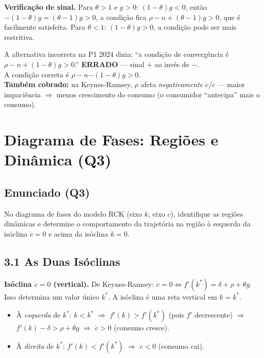 \documentclass[12pt, a4paper]{article}
\begin{document}
\textbf{Verificação de sinal.} Para $\theta > 1$ e $g > 0$: $(1-\theta)g < 0$, então $-(1-\theta)g = (\theta-1)g > 0$, a condição fica $\rho - n + (\theta-1)g > 0$, que é facilmente satisfeita. Para $\theta < 1$: $(1-\theta)g > 0$, a condição pode ser mais restritiva.

\begin{provabox}[title={P1 2024 Q2 --- O Sinal que Todo Mundo Erra}]
A alternativa incorreta na P1 2024 dizia: ``a condição de convergência é $\rho - n + (1-\theta)g > 0$.'' \textbf{ERRADO} --- sinal $+$ ao invés de $-$.\\
A condição correta é $\rho - n \mathbf{-} (1-\theta)g > 0$.\\
\textbf{Também cobrado:} na Keynes-Ramsey, $\rho$ afeta \emph{negativamente} $\dot{c}/c$ --- maior impaciência $\Rightarrow$ menos crescimento do consumo (o consumidor ``antecipa'' mais o consumo).
\end{provabox}

\section{Diagrama de Fases: Regiões e Dinâmica (Q3)}

\subsection*{Enunciado (Q3)}

No diagrama de fases do modelo RCK (eixo $k$, eixo $c$), identifique as regiões dinâmicas e determine o comportamento da trajetória na região à esquerda da isóclina $\dot{c}=0$ e acima da isóclina $\dot{k}=0$.

\subsection*{3.1 As Duas Isóclinas}

\textbf{Isóclina $\dot{c}=0$ (vertical).} De Keynes-Ramsey: $\dot{c}=0 \Leftrightarrow f'(k^*)=\delta+\rho+\theta g$. Isso determina um valor único $k^*$. A isóclina é uma reta vertical em $k = k^*$.

\begin{itemize}
\item À \emph{esquerda} de $k^*$: $k < k^*$ $\Rightarrow$ $f'(k) > f'(k^*)$ (pois $f'$ decrescente) $\Rightarrow$ $f'(k)-\delta > \rho+\theta g$ $\Rightarrow$ \textbf{$\dot{c}>0$} (consumo cresce).
\item À \emph{direita} de $k^*$: $f'(k) < f'(k^*)$ $\Rightarrow$ \textbf{$\dot{c}<0$} (consumo cai).
\end{itemize}
\end{document}
